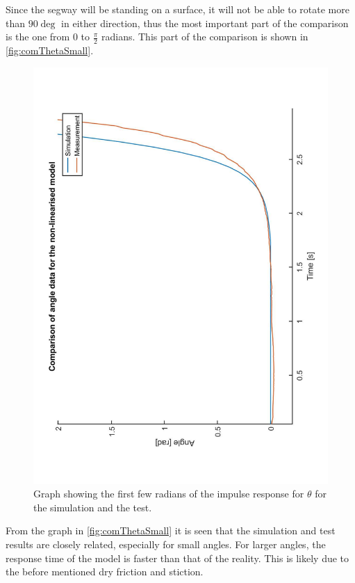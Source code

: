 Since the segway will be standing on a surface, it will not be able to rotate more than $90\deg$ in either direction, thus the most important part of the comparison is the one from 0 to $\frac{\pi}{2}$ radians. This part of the comparison is shown in \autoref{fig:comThetaSmall}.
\begin{figure}
\includegraphics[height=\textwidth, angle = -90]{figures/SimMesInvPenThetaSmall.pdf}
\caption{Graph showing the first few radians of the impulse response for $\theta$ for the simulation and the test.\label{fig:comThetaSmall}}
\end{figure}
From the graph in \autoref{fig:comThetaSmall} it is seen that the simulation and test results are closely related, especially for small angles. For larger angles, the response time of the model is faster than that of the reality. This is likely due to the before mentioned dry friction and stiction.

